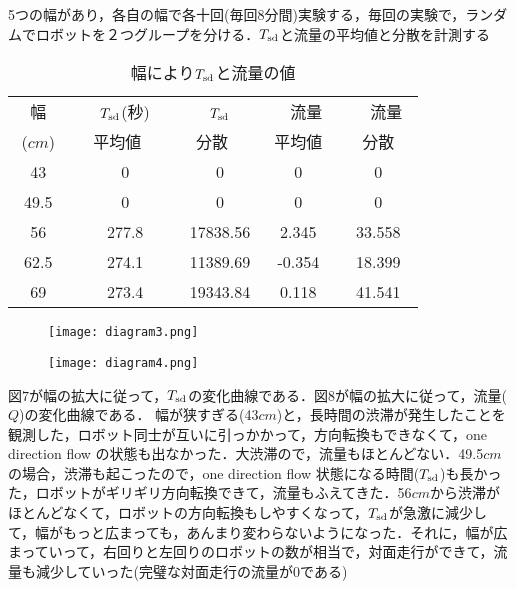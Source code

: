 5つの幅があり，各自の幅で各十回(毎回8分間)実験する，毎回の実験で，ランダムでロボットを２つグループを分ける．$T_{\rm sd}$と流量の平均値と分散を計測する
\begin{table}[!ht]
\begin{center}
\begin{tabular}{|c|c|c|c|c|}
\hline
幅　&　$T_{\rm sd}$(秒)　&　$T_{\rm sd}$　&　流量　&　流量　\\
($cm$)   &   平均値 & 分散 & 平均値 & 分散 \\
\hline
43　&　0　&　0 & 0 & 0 \\
\hline
49.5　&　0　&　0 & 0 & 0 \\
\hline
56　&　277.8　&　17838.56 & 2.345 & 33.558 \\
\hline
62.5　&　274.1　&　11389.69 & -0.354 & 18.399 \\
\hline
69　&　273.4　&　19343.84 & 0.118 & 41.541 \\
\hline
\end{tabular}
\end{center}
\caption{
幅により$T_{\rm sd}$と流量の値
}
\end{table}

\begin{figure}[ht]
    \centering
    \texttt{[image: diagram3.png]}
    \caption{}
\end{figure}
\begin{figure}[ht]
    \centering
    \texttt{[image: diagram4.png]}
    \caption{}
\end{figure}

図$7$が幅の拡大に従って，$T_{\rm sd}$の変化曲線である．図$8$が幅の拡大に従って，流量($Q$)の変化曲線である．
幅が狭すぎる(43$cm$)と，長時間の渋滞が発生したことを観測した，ロボット同士が互いに引っかかって，方向転換もできなくて，one direction flow の状態も出なかった．大渋滞ので，流量もほとんどない．49.5$cm$の場合，渋滞も起こったので，one direction flow 状態になる時間($T_{\rm sd}$)も長かった，ロボットがギリギリ方向転換できて，流量もふえてきた．56$cm$から渋滞がほとんどなくて，ロボットの方向転換もしやすくなって，$T_{\rm sd}$が急激に減少して，幅がもっと広まっても，あんまり変わらないようになった．それに，幅が広まっていって，右回りと左回りのロボットの数が相当で，対面走行ができて，流量も減少していった(完璧な対面走行の流量が$0$である)

